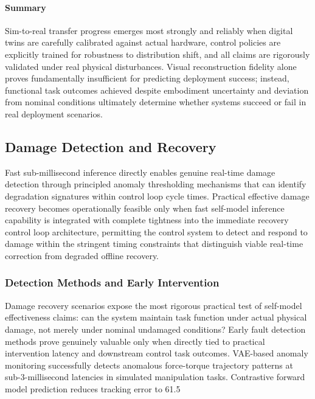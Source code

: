 ﻿\documentclass[11pt,a4paper]{article}
\begin{document}
\paragraph{Summary}

Sim-to-real transfer progress emerges most strongly and reliably when digital twins are carefully calibrated against actual hardware, control policies are explicitly trained for robustness to distribution shift, and all claims are rigorously validated under real physical disturbances. Visual reconstruction fidelity alone proves fundamentally insufficient for predicting deployment success; instead, functional task outcomes achieved despite embodiment uncertainty and deviation from nominal conditions ultimately determine whether systems succeed or fail in real deployment scenarios.

\subsection{Damage Detection and Recovery}

Fast sub-millisecond inference directly enables genuine real-time damage detection through principled anomaly thresholding mechanisms that can identify degradation signatures within control loop cycle times. Practical effective damage recovery becomes operationally feasible only when fast self-model inference capability is integrated with complete tightness into the immediate recovery control loop architecture, permitting the control system to detect and respond to damage within the stringent timing constraints that distinguish viable real-time correction from degraded offline recovery.

\subsubsection{Detection Methods and Early Intervention}

Damage recovery scenarios expose the most rigorous practical test of self-model effectiveness claims: can the system maintain task function under actual physical damage, not merely under nominal undamaged conditions? Early fault detection methods prove genuinely valuable only when directly tied to practical intervention latency and downstream control task outcomes. VAE-based anomaly monitoring successfully detects anomalous force-torque trajectory patterns at sub-3-millisecond latencies in simulated manipulation tasks. Contrastive forward model prediction reduces tracking error to 61.5%
\end{document}
